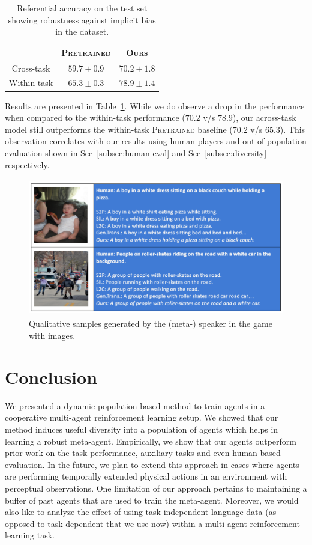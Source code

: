\documentclass{article}
\begin{document}
\begin{table}
  \centering
  \small
  \begin{tabular}{|c|c|c|}
       \toprule
       &  \textsc{Pretrained} & \textsc{Ours} \\
       \midrule
       Cross-task & $59.7 \pm 0.9$ & $70.2 \pm 1.8$ \\
       \hline
       Within-task & $65.3 \pm 0.3$ & $78.9 \pm 1.4$ \\
       \bottomrule
  \end{tabular}
  \caption{Referential accuracy on the test set showing robustness against implicit bias in the dataset.}
  \label{tab:robustness-bias}
\end{table}

Results are presented in Table~\ref{tab:robustness-bias}. While we do observe a drop in the performance when compared to the within-task performance ($70.2$ v/s $78.9$), our across-task model still outperforms the within-task \textsc{Pretrained} baseline ($70.2$ v/s $65.3$). This observation correlates with our results using human players and out-of-population evaluation shown in Sec~\ref{subsec:human-eval} and Sec~\ref{subsec:diversity} respectively.

\begin{figure}[t]
    \centering
    \includegraphics[width=\linewidth, height=6cm]{figs/image-game-samples.pdf}
    \caption{Qualitative samples generated by the (meta-) speaker in the game with images.}
    \label{fig:examples}
\end{figure}

\section{Conclusion}
We presented a dynamic population-based method to train agents in a cooperative multi-agent reinforcement learning setup. We showed that our method induces useful diversity into a population of agents which helps in learning a robust meta-agent. Empirically, we show that our agents outperform prior work on the task performance, auxiliary tasks and even human-based evaluation. In the future, we plan to extend this approach in cases where agents are performing temporally extended physical actions in an environment with perceptual observations. One limitation of our approach pertains to maintaining a buffer of past agents that are used to train the meta-agent. Moreover, we would also like to analyze the effect of using task-independent language data (as opposed to task-dependent that we use now) within a multi-agent reinforcement learning task.
\end{document}
